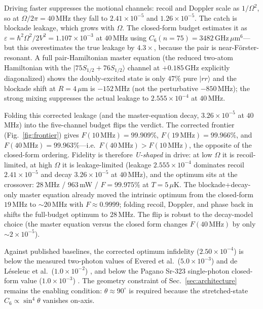 \documentclass[twocolumn]{article}
\begin{document}
Driving faster suppresses the motional channels: recoil and Doppler scale as $1/\Omega^2$, so at $\Omega/2\pi=40$\,MHz they fall to $2.41\times10^{-5}$ and $1.26\times10^{-5}$. The catch is blockade leakage, which grows with $\Omega$. The closed-form budget estimates it as $\varepsilon=\hbar^2\Omega^2/2V^2=1.107\times10^{-3}$ at $40$\,MHz using $C_6(n{=}75)=3482\,\mathrm{GHz}\,\mu\mathrm{m}^6$---but this overestimates the true leakage by $4.3\times$, because the pair is near-F\"orster-resonant. A full pair-Hamiltonian master equation (the reduced two-atom Hamiltonian with the $|75S_{1/2}{+}76S_{1/2}\rangle$ channel at $+0.185$\,GHz explicitly diagonalized) shows the doubly-excited state is only $47\%$ pure $|rr\rangle$ and the blockade shift at $R=4\,\mu$m is $-152$\,MHz (not the perturbative $-850$\,MHz); the strong mixing suppresses the actual leakage to $2.555\times10^{-4}$ at $40$\,MHz.

Folding this corrected leakage (and the master-equation decay, $3.26\times10^{-5}$ at $40$\,MHz) into the five-channel budget flips the verdict. The corrected frontier (Fig.~\ref{fig:frontier}) gives $F(10\,\mathrm{MHz})=99.909\%$, $F(19\,\mathrm{MHz})=99.966\%$, and $F(40\,\mathrm{MHz})=99.963\%$---i.e.\ $F(40\,\mathrm{MHz})>F(10\,\mathrm{MHz})$, the opposite of the closed-form ordering. Fidelity is therefore \emph{U-shaped} in drive: at low $\Omega$ it is recoil-limited, at high $\Omega$ it is leakage-limited (leakage $2.555\times10^{-4}$ dominates recoil $2.41\times10^{-5}$ and decay $3.26\times10^{-5}$ at $40$\,MHz), and the optimum sits at the crossover: $28$\,MHz / $963$\,mW / $F=99.975\%$ at $T=5\,\mu$K. The blockade+decay-only master equation already moved the intrinsic optimum from the closed-form $19$\,MHz to $\sim20$\,MHz with $F\approx0.9999$; folding recoil, Doppler, and phase back in shifts the full-budget optimum to $28$\,MHz. The flip is robust to the decay-model choice (the master equation versus the closed form changes $F(40\,\mathrm{MHz})$ by only $\sim2\times10^{-5}$).

Against published baselines, the corrected optimum infidelity ($2.50\times10^{-4}$) is below the measured two-photon values of Evered et al.\ ($5.0\times10^{-3}$) and de L\'eseleuc et al.\ ($1.0\times10^{-2}$) \cite{Evered2023,LeSeleuc2018}, and below the Pagano Sr-323 single-photon closed-form value ($1.0\times10^{-3}$) \cite{Pagano2022}. The geometry constraint of Sec.~\ref{sec:architecture} remains the enabling condition: $\theta\approx90^\circ$ is required because the stretched-state $C_6\propto\sin^4\theta$ vanishes on-axis.
\end{document}
